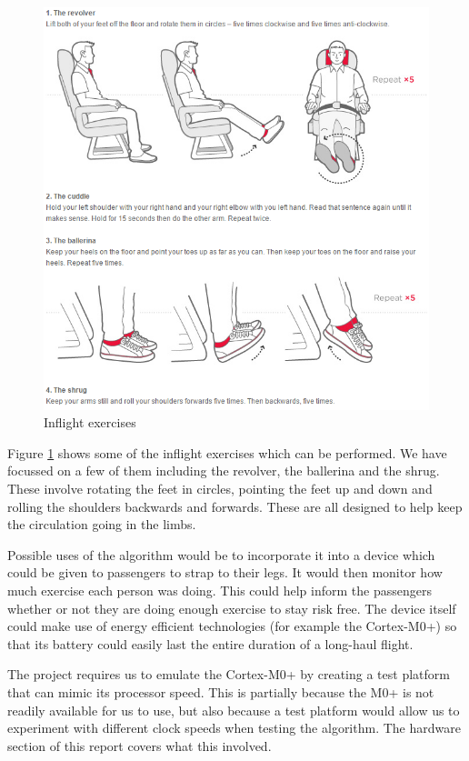 \begin{figure}[h]
  \centering
    \includegraphics[width=1.0\textwidth]{figures/exercises}
  \caption{Inflight exercises \cite{virgin2015exercises}}
  \label{fig:exercises}
\end{figure}

Figure \ref{fig:exercises} shows some of the inflight exercises which can be performed. We have focussed on a few of them including the revolver, the ballerina and the shrug. These involve rotating the feet in circles, pointing the feet up and down and rolling the shoulders backwards and forwards. These are all designed to help keep the circulation going in the limbs.

Possible uses of the algorithm would be to incorporate it into a device which could be given to passengers to strap to their legs. It would then monitor how much exercise each person was doing. This could help inform the passengers whether or not they are doing enough exercise to stay risk free. The device itself could make use of energy efficient technologies (for example the Cortex-M0+) so that its battery could easily last the entire duration of a long-haul flight.

The project requires us to emulate the Cortex-M0+ by creating a test platform that can mimic its processor speed. This is partially because the M0+ is not readily available for us to use, but also because a test platform would allow us to experiment with different clock speeds when testing the algorithm. The hardware section of this report covers what this involved.

